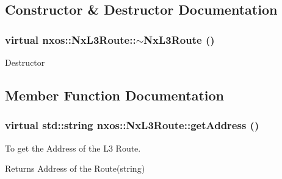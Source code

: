\subsection{Constructor \& Destructor Documentation}
\hypertarget{classnxos_1_1NxL3Route_abb3762fb6629ba1900e877555cbb69dc}{
\subsubsection[{$\sim$NxL3Route}]{\setlength{\rightskip}{0pt plus 5cm}virtual nxos::NxL3Route::$\sim$NxL3Route ()}}
\label{classnxos_1_1NxL3Route_abb3762fb6629ba1900e877555cbb69dc}
Destructor 

\subsection{Member Function Documentation}
\hypertarget{classnxos_1_1NxL3Route_a3176245539589bf745ce1d196975b3c9}{
\subsubsection[{getAddress}]{\setlength{\rightskip}{0pt plus 5cm}virtual std::string nxos::NxL3Route::getAddress ()}}
\label{classnxos_1_1NxL3Route_a3176245539589bf745ce1d196975b3c9}
To get the Address of the L3 Route.

\begin{DoxyReturn}{Returns}
Address of the Route(string)
\end{DoxyReturn}

